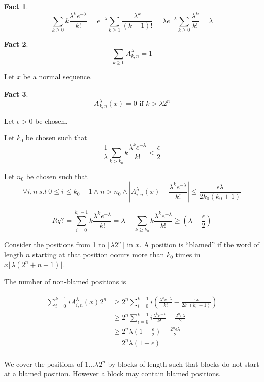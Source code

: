 \documentclass[11pt,a4paper]{tesis}
\newtheorem{fact}{Fact}[section]
\theoremstyle{definition}
\begin{document}
\begin{fact}
    $$\sum_{k \geq 0} k\frac{\lambda^ke^{-\lambda}}{k!} = e^{-\lambda}\sum_{k \geq 1} \frac{\lambda^k}{(k-1)!} = \lambda e^{-\lambda} \sum_{k \geq 0} \frac{\lambda^k}{k!}= \lambda$$
\end{fact}





\begin{fact}
    $$\sum_{k \geq 0} A^\lambda_{k,n} = 1$$
\end{fact}

Let $x$ be a normal sequence.

\begin{fact}
    $$A^\lambda_{k,n}(x) = 0 \textrm{ if } k > \lambda2^n$$
\end{fact}

Let $\epsilon > 0$ be chosen.

Let $k_0$ be chosen such that 
$$\frac{1}{\lambda} \sum_{k > k_0} k\frac{\lambda^ke^{-\lambda}}{k!} < \frac{\epsilon}{2}$$

Let $n_0$ be chosen such that 
$$\forall i,n \: s.t \:  0 \leq i \leq k_0 - 1 \wedge n > n_0 \wedge |A^\lambda_{i,n}(x) - \frac{\lambda^ke^{-\lambda}}{k!}| \leq \frac{\epsilon\lambda}{2k_0(k_0+1)}$$

$$Rq? = \sum_{i=0}^{k_0-1} k\frac{\lambda^ke^{-\lambda}}{k!} = \lambda - \sum_{k\geq k_0} k\frac{\lambda^ke^{-\lambda}}{k!} \geq (\lambda - \frac{\epsilon}{2})$$

Consider the positions from 1 to $\lfloor\lambda2^n\rfloor$ in $x$. A position is ``blamed'' if the word of length $n$ starting at that position occurs more than $k_0$ times in $x\lfloor\lambda(2^n+n-1)\rfloor$.

The number of non-blamed positions is


\begin{align*}
    \sum_{i=0}^{k-1} iA^\lambda_{i,n}(x) 2^n &\geq 2^n\sum_{i=0}^{k-1} i (\frac{\lambda^ke^{-\lambda}}{k!} - \frac{\epsilon\lambda}{2k_0(k_0+1)}) \\
    &\geq 2^n \sum_{i=0}^{k-1} i\frac{\lambda^ke^{-\lambda}}{k!} - \frac{2^n\epsilon\lambda}{2} \\
    &\geq 2^n\lambda (1-\frac{\epsilon}{2}) - \frac{2^n\epsilon\lambda}{2} \\
    &= 2^n\lambda(1-\epsilon) \\
\end{align*}

We cover the positions of $1\dots \lambda2^n$ by blocks of length such that blocks do not start at a blamed  position. However a block may contain blamed positions.
 
\end{document}
